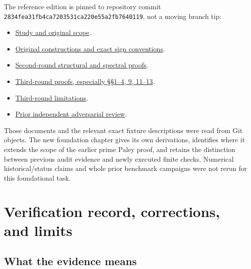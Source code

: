 \documentclass[
  11pt,
]{article}
\providecommand{\tightlist}{%
  \setlength{\itemsep}{0pt}\setlength{\parskip}{0pt}}
\begin{document}
The reference edition is pinned to repository commit
\texttt{2834fea31fb4ca7203531ca220e55a2fb7640119}, not a moving branch
tip:

\begin{itemize}
\tightlist
\item
  \href{https://github.com/Drsunflowerherbert/Codex-for-Math/blob/2834fea31fb4ca7203531ca220e55a2fb7640119/hadamard-study/README.md}{Study
  and original scope}.
\item
  \href{https://github.com/Drsunflowerherbert/Codex-for-Math/blob/2834fea31fb4ca7203531ca220e55a2fb7640119/hadamard-study/PROOFS.md}{Original
  constructions and exact sign conventions}.
\item
  \href{https://github.com/Drsunflowerherbert/Codex-for-Math/blob/2834fea31fb4ca7203531ca220e55a2fb7640119/hadamard-study/round2/PROOFS.md}{Second-round
  structural and spectral proofs}.
\item
  \href{https://github.com/Drsunflowerherbert/Codex-for-Math/blob/2834fea31fb4ca7203531ca220e55a2fb7640119/hadamard-study/round3/PROOFS.md}{Third-round
  proofs, especially §§1--4, 9, 11--13}.
\item
  \href{https://github.com/Drsunflowerherbert/Codex-for-Math/blob/2834fea31fb4ca7203531ca220e55a2fb7640119/hadamard-study/round3/LESSONS.md}{Third-round
  limitations}.
\item
  \href{https://github.com/Drsunflowerherbert/Codex-for-Math/blob/2834fea31fb4ca7203531ca220e55a2fb7640119/hadamard-study/round3/reviews/REVIEW.md}{Prior
  independent adversarial review}.
\end{itemize}

Those documents and the relevant exact fixture descriptions were read
from Git objects. The new foundation chapter gives its own derivations,
identifies where it extends the scope of the earlier prime Paley proof,
and retains the distinction between previous audit evidence and newly
executed finite checks. Numerical historical/status claims and whole
prior benchmark campaigns were not rerun for this foundational task.

\section{Verification record, corrections, and
limits}\label{verification-record-corrections-and-limits}

\subsection{What the evidence means}\label{what-the-evidence-means}
\end{document}
